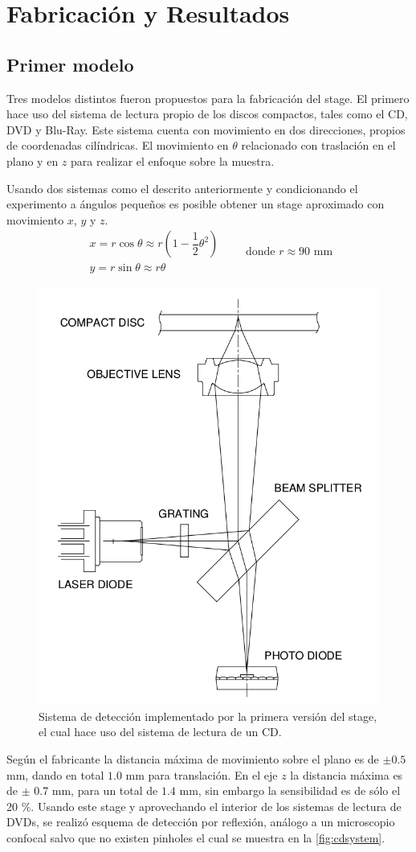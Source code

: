 \chapter{Fabricación y Resultados}\label{ch:resultados}
\section{Primer modelo}
Tres modelos distintos fueron propuestos para la fabricación del stage. El primero hace uso del sistema de lectura propio de los discos compactos, tales como el CD, DVD y Blu-Ray. Este sistema cuenta con movimiento en dos direcciones, propios de coordenadas cilíndricas. El movimiento en $\theta$ relacionado con traslación en el plano y en $z$ para realizar el enfoque sobre la muestra. 

Usando dos sistemas como el descrito anteriormente y condicionando el experimento a ángulos pequeños es posible obtener un stage aproximado con movimiento $x$, $y$ y $z$.
\begin{equation}
	\begin{matrix}
		x = r\cos\theta \approx r\left(1 - \dfrac{1}{2}\theta^2\right) \\
		y = r\sin\theta \approx r\theta
	\end{matrix}
	\qquad
	\text{donde $r \approx 90$ mm}
\end{equation}

\begin{figure}[h]
	\centering
	\includegraphics[width=0.3\linewidth]{figures/cdsystem.png}
	\caption{Sistema de detección implementado por la primera versión del stage, el cual hace uso del sistema de lectura de un CD.}
	\label{fig:cdsystem}
\end{figure}

Según el fabricante la distancia máxima de movimiento sobre el plano es de $\pm 0.5$ mm, dando en total $1.0$ mm para translación. En el eje $z$ la distancia máxima es de $\pm$ 0.7 mm, para un total de $1.4$ mm, sin embargo la sensibilidad es de sólo el 20 \%. Usando este stage y aprovechando el interior de los sistemas de lectura de DVDs, se realizó esquema de detección por reflexión, análogo a un microscopio confocal salvo que no existen pinholes el cual se muestra en la \autoref{fig:cdsystem}.

